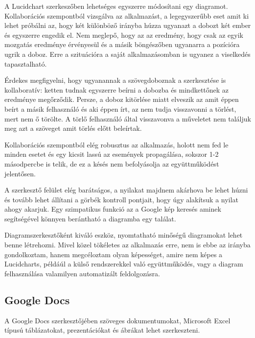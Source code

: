 A Lucidchart szerkeszőben lehetséges egyszerre módosítani egy diagramot. Kollaborációs szempontból vizsgálva az alkalmazást, a legegyszerűbb eset amit ki lehet próbálni az, hogy két különböző irányba húzza ugyanazt a dobozt két ember és egyszerre engedik el. Nem meglepő, hogy az az eredmény, hogy csak az egyik mozgatás eredménye érvényesül és a másik böngészőben ugyanarra a pozícióra ugrik a doboz. Erre a szituációra a saját alkalmazásomban is ugyanez a viselkedés tapasztalható.

Érdekes megfigyelni, hogy ugyanannak a szövegdoboznak a szerkesztése is kollaboratív: ketten tudnak egyszerre beírni a dobozba és mindkettőnek az eredménye megőrződik. Persze, a doboz kitörlése miatt elveszik az amit éppen beírt a másik felhasználó és aki éppen írt, az nem tudja visszavonni a törlést, mert nem ő törölte. A törlő felhasználó által visszavonva a műveletet nem találjuk meg azt a szöveget amit törlés előtt beleírtak.

Kollaborációs szempontból elég robusztus az alkalmazás, holott nem fed le minden esetet és egy kicsit lassú az események propagálása, sokszor 1-2 másodpercbe is telik, de ez a késés nem befolyásolja az együttműködést jelentősen.

A szerkesztő felület elég barátságos, a nyilakat majdnem akárhova be lehet húzni és tovább lehet állítani a görbék kontroll pontjait, hogy úgy alakítsuk a nyilat ahogy akarjuk. Egy szimpatikus funkció az a Google kép keresés aminek segítségével könnyen berántható a diagramba egy találat.

Diagramszerkesztőként kiváló eszköz, nyomtatható minőségű diagramokat lehet benne létrehozni. Mivel közel tökéletes az alkalmazás erre, nem is ebbe az irányba gondolkoztam, hanem megcéloztam olyan képességet, amire nem képes a Lucidcharts, példáúl a külső rendszerekkel való együttműködés, vagy a diagram felhasználása valamilyen automatizált feldolgozásra. 










 
\subsection{Google Docs}

A Google Docs szerkesztőjében szöveges dokumentumokat, Microsoft Excel típusú táblázatokat, prezentációkat és ábrákat lehet szerkeszteni.

